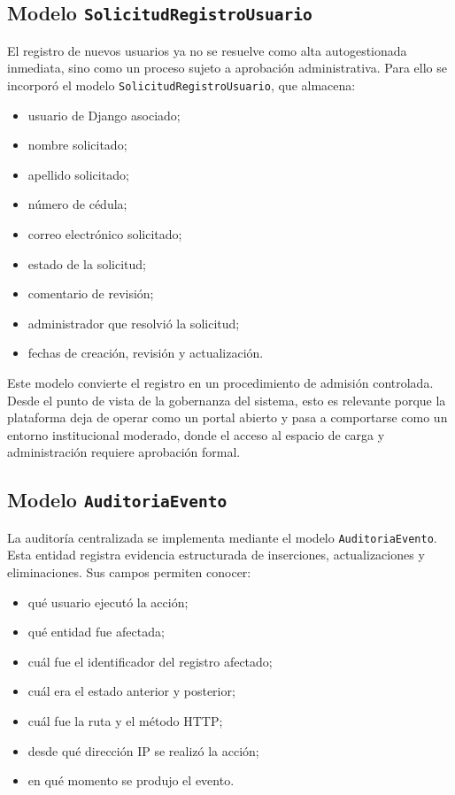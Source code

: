 \documentclass[12pt,a4paper]{report}
\begin{document}
\subsection{Modelo \texttt{SolicitudRegistroUsuario}}

El registro de nuevos usuarios ya no se resuelve como alta autogestionada inmediata, sino como un proceso sujeto a aprobaci\'on administrativa. Para ello se incorpor\'o el modelo \texttt{SolicitudRegistroUsuario}, que almacena:

\begin{itemize}
    \item usuario de Django asociado;
    \item nombre solicitado;
    \item apellido solicitado;
    \item n\'umero de c\'edula;
    \item correo electr\'onico solicitado;
    \item estado de la solicitud;
    \item comentario de revisi\'on;
    \item administrador que resolvi\'o la solicitud;
    \item fechas de creaci\'on, revisi\'on y actualizaci\'on.
\end{itemize}

Este modelo convierte el registro en un procedimiento de admisi\'on controlada. Desde el punto de vista de la gobernanza del sistema, esto es relevante porque la plataforma deja de operar como un portal abierto y pasa a comportarse como un entorno institucional moderado, donde el acceso al espacio de carga y administraci\'on requiere aprobaci\'on formal.

\subsection{Modelo \texttt{AuditoriaEvento}}

La auditor\'ia centralizada se implementa mediante el modelo \texttt{AuditoriaEvento}. Esta entidad registra evidencia estructurada de inserciones, actualizaciones y eliminaciones. Sus campos permiten conocer:

\begin{itemize}
    \item qu\'e usuario ejecut\'o la acci\'on;
    \item qu\'e entidad fue afectada;
    \item cu\'al fue el identificador del registro afectado;
    \item cu\'al era el estado anterior y posterior;
    \item cu\'al fue la ruta y el m\'etodo HTTP;
    \item desde qu\'e direcci\'on IP se realiz\'o la acci\'on;
    \item en qu\'e momento se produjo el evento.
\end{itemize}
\end{document}
